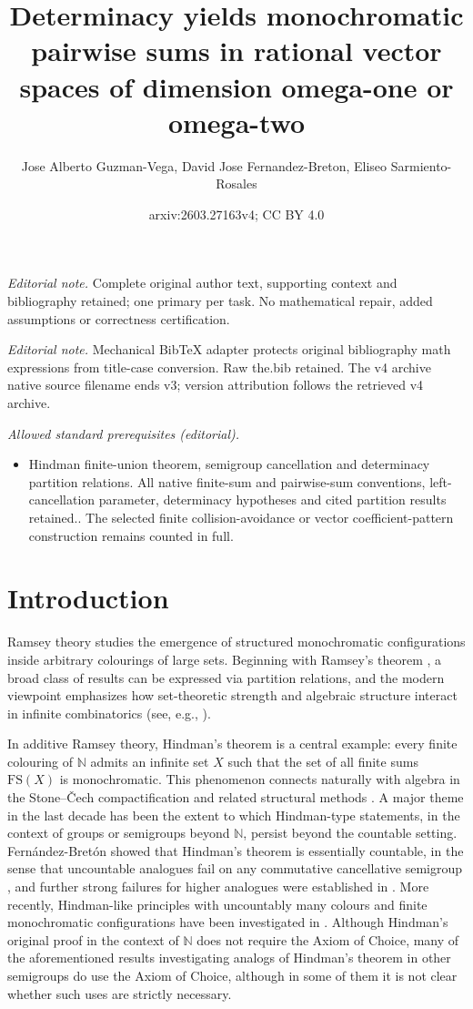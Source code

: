 \documentclass[10pt,a4paper]{amsart}
\title{Determinacy yields monochromatic pairwise sums in rational vector spaces of dimension omega-one or omega-two}
\author{Jose Alberto Guzman-Vega, David Jose Fernandez-Breton, Eliseo Sarmiento-Rosales}
\date{arxiv:2603.27163v4; CC BY 4.0}
\theoremstyle{definition}
\theoremstyle{remark}
\numberwithin{equation}{section}
\begin{document}
\maketitle
\noindent\textit{Editorial note.} Complete original author text, supporting context and bibliography retained; one primary per task. No mathematical repair, added assumptions or correctness certification.\par\medskip
\noindent\textit{Editorial note.} Mechanical BibTeX adapter protects original bibliography math expressions from title-case conversion. Raw the.bib retained. The v4 archive native source filename ends v3; version attribution follows the retrieved v4 archive.\par\medskip
\noindent\textit{Allowed standard prerequisites (editorial).}\begin{itemize}
\item Hindman finite-union theorem, semigroup cancellation and determinacy partition relations. All native finite-sum and pairwise-sum conventions, left-cancellation parameter, determinacy hypotheses and cited partition results retained.. The selected finite collision-avoidance or vector coefficient-pattern construction remains counted in full.
\end{itemize}\medskip
\section{Introduction}
Ramsey theory studies the emergence of structured monochromatic configurations inside arbitrary colourings of large sets. 
Beginning with Ramsey's theorem \cite{Ramsey1930}, a broad class of results can be expressed via partition relations, and the modern viewpoint emphasizes how set-theoretic strength and algebraic structure interact in infinite combinatorics (see, e.g., \cite{Jech2003, Kanamori2003, Kunen1980}). 

In additive Ramsey theory, Hindman's theorem \cite{Hindman1974} is a central example: every finite colouring of $\mathbb{N}$ admits an infinite set $X$ such that the set of all finite sums $\mathrm{FS}(X)$ is monochromatic. 
This phenomenon connects naturally with algebra in the Stone--\v{C}ech compactification and related structural methods \cite{HindmanStrauss2012}. A major theme in the last decade has been the extent to which Hindman-type statements, in the context of groups or semigroups beyond $\mathbb N$, persist beyond the countable setting. 
Fern\'andez-Bret\'on showed that Hindman's theorem is essentially countable, in the sense that uncountable analogues fail on any commutative cancellative semigroup \cite{Fernandez2018}, and further strong failures for higher analogues were established in \cite{FernandezRinot2017}. 
More recently, Hindman-like principles with uncountably many colours and finite monochromatic configurations have been investigated in \cite{FernandezLee2020, Komjath2018}. Although Hindman's original proof in the context of $\mathbb N$ does not require the Axiom of Choice, many of the aforementioned results investigating analogs of Hindman's theorem in other semigroups do use the Axiom of Choice, although in some of them it is not clear whether such uses are strictly necessary.
\end{document}
